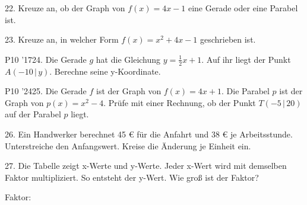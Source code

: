 \documentclass[11pt]{article}
\begin{document}
\pfgruppe{}
\begin{pfaufg}{}{22.}{}
Kreuze an, ob der Graph von $f(x) = 4x - 1$ eine Gerade oder eine Parabel ist.
\end{pfaufg}
\begin{pfaufg}{}{23.}{}
Kreuze an, in welcher Form $f(x) = x^2 + 4x - 1$ geschrieben ist.
\end{pfaufg}
\pfgruppe{}
\begin{pfaufg}{P10 ’17}{24.}{}
Die Gerade $g$ hat die Gleichung $y = \tfrac{1}{2}x + 1$. Auf ihr liegt der Punkt $A(-10\,|\,y)$. Berechne seine y-Koordinate.
\end{pfaufg}
\pfgruppe{}
\begin{pfaufg}{P10 ’24}{25.}{}
Die Gerade $f$ ist der Graph von $f(x) = 4x + 1$. Die Parabel $p$ ist der Graph von $p(x) = x^2 - 4$. Prüfe mit einer Rechnung, ob der Punkt $T(-5\,|\,20)$ auf der Parabel $p$ liegt.
\end{pfaufg}
\pfgruppe{}
\begin{pfaufg}{}{26.}{}
Ein Handwerker berechnet 45 € für die Anfahrt und 38 € je Arbeitsstunde. Unterstreiche den Anfangswert. Kreise die Änderung je Einheit ein.
\end{pfaufg}
\begin{pfaufg}{}{27.}{}
Die Tabelle zeigt x-Werte und y-Werte. Jeder x-Wert wird mit demselben Faktor multipliziert. So entsteht der y-Wert. Wie groß ist der Faktor?
\par\smallskip\noindent {}\par
\par\noindent Faktor: \leerfeld \par
{}
\end{pfaufg}
\pfgruppe{}
\end{document}
